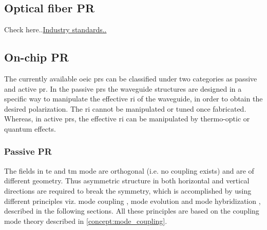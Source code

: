 \documentclass[../report.tex]{subfiles}
\begin{document}
	\subsection{Optical fiber PR}
	Check here..\href{http://www.amstechnologies.com/es/products/optical-technologies/equipment/fiber-optic-test-measurement/measurement-of-fiber-properties/polarisation-mode/view/electrically-driven-polarization-controllers-scramblers/}{Industry standards..}
	
	\subsection{On-chip PR}
The currently available \gls{oeic} \gls{pr}s can be classified under two categories as passive and active \gls{pr}. In the passive \gls{pr}s the waveguide structures are designed in a specific way to manipulate the effective \gls{ri} of the waveguide, in order to obtain the desired polarization. The \gls{ri} cannot be manipulated or tuned once fabricated. Whereas, in active \gls{pr}s, the effective \gls{ri} can be manipulated by thermo-optic or quantum effects.
	
		\subsubsection{Passive PR}
The fields in \gls{te} and \gls{tm} mode are orthogonal (i.e. no coupling exists) and are of different geometry. Thus asymmetric structure in both horizontal and vertical directions are required to break the symmetry, which is accomplished by using different principles viz. mode coupling \cite{dai_novel_2011,ding_Integrated_2013,wang_design_2014}, mode evolution \cite{zhang_selected_2010,chen_compact_2011,zhang_efficient_2012,justin_conference_2012,kazuhiro_integrated_2015} and mode hybridization \cite{fukuda_integrated_2008,leung_numerical_2011,vermeulen_Silicon_2012,velasco_ultracompact_2012}, described in the following sections. All these principles are based on the coupling mode theory described in \ref{concept:mode_coupling}.
			
\end{document}
